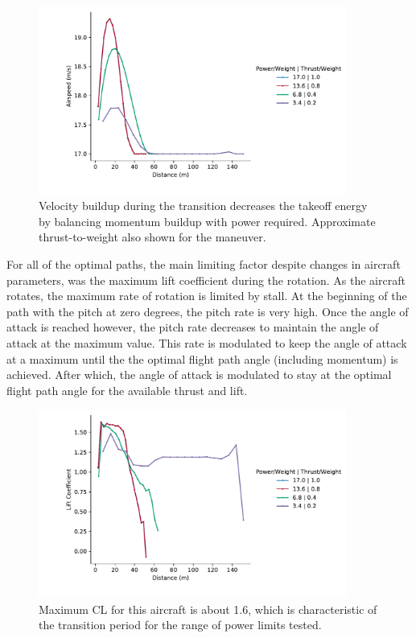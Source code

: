 \documentclass[10pt,english]{article}
\begin{document}
\begin{figure}[H]
\centering
\includegraphics[trim={.0cm 0.5cm .0cm 0cm},clip,width=0.9\textwidth]{d_Va}
\vspace{-5pt}
\caption{Velocity buildup during the transition decreases the takeoff energy by balancing momentum buildup with power required. Approximate thrust-to-weight also shown for the maneuver.}
\label{f:d_Va}
\end{figure}

For all of the optimal paths, the main limiting factor despite changes in aircraft parameters, was the maximum lift coefficient during the rotation.  As the aircraft rotates, the maximum rate of rotation is limited by stall.  At the beginning of the path with the pitch at zero degrees, the pitch rate is very high.  Once the angle of attack is reached however, the pitch rate decreases to maintain the angle of attack at the maximum value.  This rate is modulated to keep the angle of attack at a maximum until the the optimal flight path angle (including momentum) is achieved.  After which, the angle of attack is modulated to stay at the optimal flight path angle for the available thrust and lift.

\begin{figure}[H]
\centering
\includegraphics[trim={.0cm 0.5cm .0cm 0cm},clip,width=0.9\textwidth]{d_CL}
\vspace{-5pt}
\caption{Maximum CL for this aircraft is about 1.6, which is characteristic of the transition period for the range of power limits tested.}
\label{f:d_CL}
\end{figure}
\end{document}
